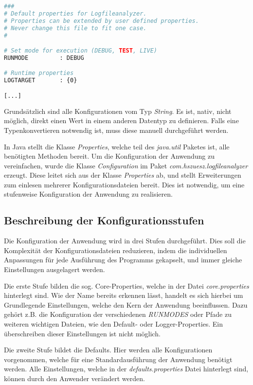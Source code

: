 \begin{lstlisting}[language=Bash,caption=Auszug aus default.properties,label=lis:AuszugDefaultProperties]
###
# Default properties for Logfileanalyzer.
# Properties can be extended by user defined properties.
# Never change this file to fit one case.
#

# Set mode for execution (DEBUG, TEST, LIVE)
RUNMODE         : DEBUG

# Runtime properties
LOGTARGET       : {0}

[...]
\end{lstlisting}

Grundsätzlich sind alle Konfigurationen vom Typ \textit{String}. Es ist, nativ, nicht möglich, direkt einen Wert in einem anderen Datentyp zu definieren. Falls eine Typenkonvertieren notwendig ist, muss diese manuell durchgeführt werden.

In Java stellt die Klasse \textit{Properties}, welche teil des \textit{java.util} Paketes ist, alle benötigten Methoden bereit. Um die Konfiguration der Anwendung zu vereinfachen, wurde die Klasse \textit{Configuration} im Paket \textit{com.hszuesz.logfileanalyzer} erzeugt. Diese leitet sich aus der Klasse \textit{Properties} ab, und stellt Erweiterungen zum einlesen mehrerer Konfigurationsdateien bereit. Dies ist notwendig, um eine stufenweise Konfiguration der Anwendung zu realisieren.

\subsection{Beschreibung der Konfigurationsstufen}
Die Konfiguration der Anwendung wird in drei Stufen durchgeführt. Dies soll die Komplexität der Konfigurationsdateien reduzieren, indem die individuellen Anpassungen für jede Ausführung des Programms gekapselt, und immer gleiche Einstellungen ausgelagert werden.

Die erste Stufe bilden die sog. Core-Properties, welche in der Datei \textit{core.properties} hinterlegt sind. Wie der Name bereits erkennen lässt, handelt es sich hierbei um Grundlegende Einstellungen, welche den Kern der Anwendung beeinflussen. Dazu gehört z.B. die Konfiguration der verschiedenen \textit{RUNMODES} oder Pfade zu weiteren wichtigen Dateien, wie den Default- oder Logger-Properties. Ein überschreiben dieser Einstellungen ist nicht möglich.

Die zweite Stufe bildet die Defaults. Hier werden alle Konfigurationen vorgenommen, welche für eine Standardausführung der Anwendung benötigt werden. Alle Einstellungen, welche in der \textit{defaults.properties} Datei hinterlegt sind, können durch den Anwender verändert werden.

